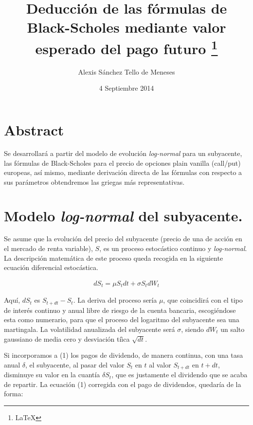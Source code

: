 \documentclass[12pt]{article}
\title{Deducci\'{o}n de las f\'{o}rmulas de Black-Scholes mediante valor esperado del pago futuro \footnote{\LaTeX}}
\author{Alexis S\'{a}nchez Tello de Meneses}
\date{4 Septiembre 2014}
\begin{document}
\maketitle

\section{Abstract}

Se desarrollar\'{a} a partir del modelo de evoluci\'{o}n {\em log-normal} para un subyacente, las f\'{o}rmulas de
Black-Scholes para el precio de opciones plain vanilla (call/put) europeas, as\'{i} mismo, mediante derivaci\'{o}n directa
de las f\'{o}rmulas con respecto a sus par\'{a}metros obtendremos las griegas m\'{a}s representativas.

\section{Modelo {\em log-normal} del subyacente.}

Se asume que la evoluci\'{o}n del precio del subyacente (precio de una de acci\'{o}n en el mercado de
renta variable), $S$, es un proceso estoc\'{a}stico continuo y {\em log-normal}. La descripci\'{o}n
matem\'{a}tica de este proceso queda recogida en la siguiente ecuaci\'{o}n diferencial estoc\'{a}stica.
\newline

\begin{eqnarray}
	dS_{t} = \mu S_{t}dt + \sigma S_{t}dW_{t}
\end{eqnarray}
\newline

Aqu\'{i}, $dS_{t}$ es $S_{t+dt}-S_{t}$. La deriva del proceso ser\'{i}a $\mu$, que coincidir\'{a} con el tipo de 
inter\'{e}s continuo y anual libre de riesgo de la cuenta bancaria, escogi\'{e}ndose esta como numerario, para que el
proceso del logaritmo del subyacente sea una martingala. La volatilidad anualizada del subyacente ser\'{a} $\sigma$,
siendo $dW_{t}$ un salto gaussiano de media cero y desviaci\'{o}n t\'{i}ìca $\sqrt{dt}$.
\newline

Si incorporamos a (1) los pagos de dividendo, de manera continua, con una tasa anual $\delta$, el subyacente, al pasar del
valor $S_{t}$ en $t$ al valor $S_{t+dt}$ en $t+dt$, disminuye su valor en la cuant\'{i}a $\delta S_{t}$, que es 
justamente el dividendo que se acaba de repartir. La ecuaci\'{o}n (1) corregida con el pago de dividendos, quedar\'{i}a de
la forma:
\newline
\end{document}
